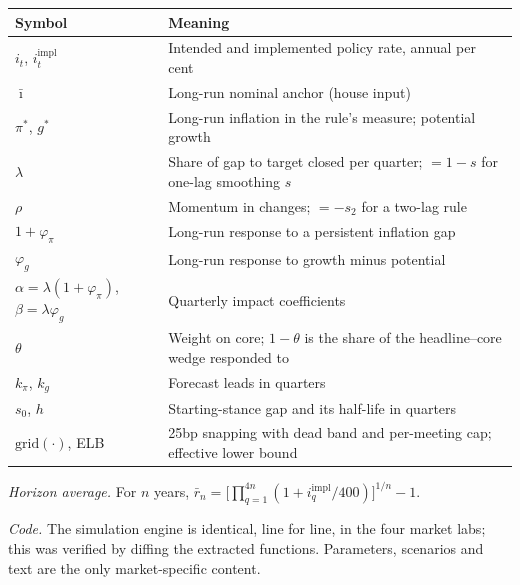 \documentclass[11pt,a4paper]{article}
\newcommand{\ib}{\bar{\imath}}
\newcommand{\pis}{\pi^{*}}
\newcommand{\gs}{g^{*}}
\begin{document}
\begin{small}
\begin{tabular}{@{}L{34mm}L{118mm}@{}}
\toprule
Symbol & Meaning \\
\midrule
$i_t$, $i^{\mathrm{impl}}_t$ & Intended and implemented policy rate, annual per cent \\
$\ib$ & Long-run nominal anchor (house input) \\
$\pis$, $\gs$ & Long-run inflation in the rule's measure; potential growth \\
$\lambda$ & Share of gap to target closed per quarter; $=1-s$ for one-lag smoothing $s$ \\
$\rho$ & Momentum in changes; $=-s_2$ for a two-lag rule \\
$1+\varphi_\pi$ & Long-run response to a persistent inflation gap \\
$\varphi_g$ & Long-run response to growth minus potential \\
$\alpha=\lambda(1+\varphi_\pi)$, $\beta=\lambda\varphi_g$ & Quarterly impact coefficients \\
$\theta$ & Weight on core; $1-\theta$ is the share of the headline--core wedge responded to \\
$k_\pi$, $k_g$ & Forecast leads in quarters \\
$s_0$, $h$ & Starting-stance gap and its half-life in quarters \\
$\mathrm{grid}(\cdot)$, ELB & 25bp snapping with dead band and per-meeting cap; effective lower bound \\
\bottomrule
\end{tabular}
\end{small}

\medskip
\noindent\emph{Horizon average.} For $n$ years, $\bar r_n = \big[\prod_{q=1}^{4n}(1+i^{\mathrm{impl}}_q/400)\big]^{1/n}-1$.

\noindent\emph{Code.} The simulation engine is identical, line for line, in the four market labs; this was verified by diffing the extracted functions. Parameters, scenarios and text are the only market-specific content.

\printbibliography
\end{document}
